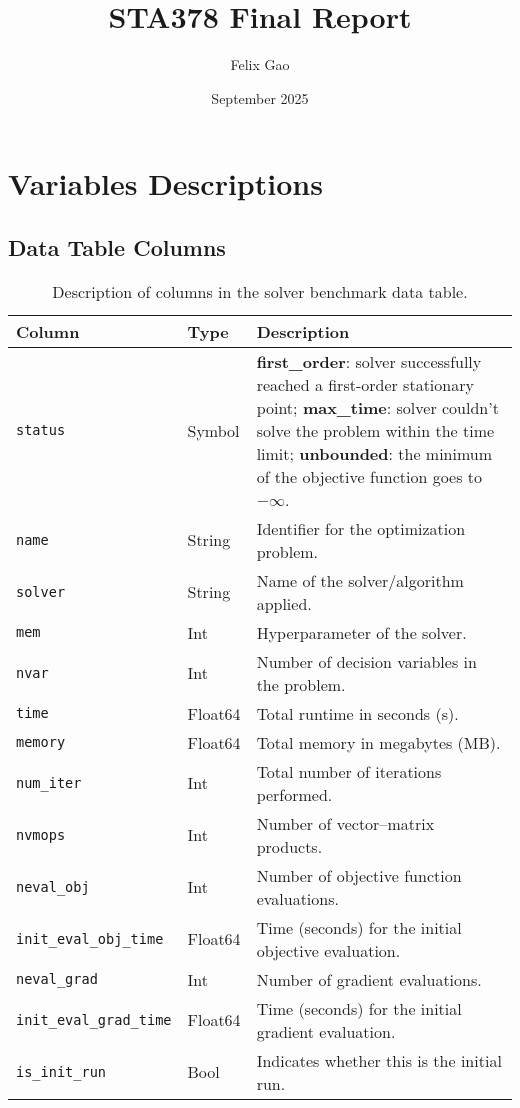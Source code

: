 \documentclass{article}
\title{STA378 Final Report}
\author{Felix Gao}
\date{September 2025}
\begin{document}
\maketitle

\section{Variables Descriptions}
\subsection*{Data Table Columns}

\begin{table}[H]
\centering
\begin{tabularx}{\textwidth}{|l|l|Y|}
\hline
\textbf{Column} & \textbf{Type} & \textbf{Description} \\
\hline
\texttt{status} & Symbol &
\textbf{first\_order}: solver successfully reached a first-order stationary point; 
\textbf{max\_time}: solver couldn't solve the problem within the time limit; 
\textbf{unbounded}: the minimum of the objective function goes to $-\infty$. \\
\hline
\texttt{name} & String & Identifier for the optimization problem. \\
\hline
\texttt{solver} & String & Name of the solver/algorithm applied. \\
\hline
\texttt{mem} & Int & Hyperparameter of the solver. \\
\hline
\texttt{nvar} & Int & Number of decision variables in the problem. \\
\hline
\texttt{time} & Float64 & Total runtime in seconds (s). \\
\hline
\texttt{memory} & Float64 & Total memory in megabytes (MB). \\
\hline
\texttt{num\_iter} & Int & Total number of iterations performed. \\
\hline
\texttt{nvmops} & Int & Number of vector–matrix products. \\
\hline
\texttt{neval\_obj} & Int & Number of objective function evaluations. \\
\hline
\texttt{init\_eval\_obj\_time} & Float64 & Time (seconds) for the initial objective evaluation. \\
\hline
\texttt{neval\_grad} & Int & Number of gradient evaluations. \\
\hline
\texttt{init\_eval\_grad\_time} & Float64 & Time (seconds) for the initial gradient evaluation. \\
\hline
\texttt{is\_init\_run} & Bool & Indicates whether this is the initial run. \\
\end{tabularx}
\caption{Description of columns in the solver benchmark data table.}
\end{table}

\section{}
\end{document}
